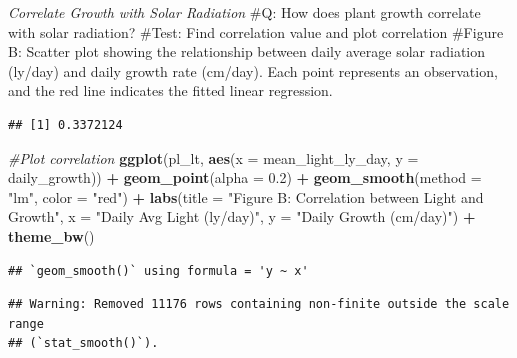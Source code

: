 \documentclass[
]{article}
\newenvironment{Shaded}{\begin{snugshade}}{\end{snugshade}}
\newcommand{\AttributeTok}[1]{\textcolor[rgb]{0.13,0.29,0.53}{#1}}
\newcommand{\CommentTok}[1]{\textcolor[rgb]{0.56,0.35,0.01}{\textit{#1}}}
\newcommand{\FloatTok}[1]{\textcolor[rgb]{0.00,0.00,0.81}{#1}}
\newcommand{\FunctionTok}[1]{\textcolor[rgb]{0.13,0.29,0.53}{\textbf{#1}}}
\newcommand{\NormalTok}[1]{#1}
\newcommand{\OtherTok}[1]{\textcolor[rgb]{0.56,0.35,0.01}{#1}}
\newcommand{\SpecialCharTok}[1]{\textcolor[rgb]{0.81,0.36,0.00}{\textbf{#1}}}
\newcommand{\StringTok}[1]{\textcolor[rgb]{0.31,0.60,0.02}{#1}}
\begin{document}
\emph{Correlate Growth with Solar Radiation} \#Q: How does plant growth
correlate with solar radiation? \#Test: Find correlation value and plot
correlation \#Figure B: Scatter plot showing the relationship between
daily average solar radiation (ly/day) and daily growth rate (cm/day).
Each point represents an observation, and the red line indicates the
fitted linear regression.

\begin{Shaded}
\end{Shaded}

\begin{verbatim}
## [1] 0.3372124
\end{verbatim}

\begin{Shaded}
\begin{Highlighting}[]
\CommentTok{\#Plot correlation}
\FunctionTok{ggplot}\NormalTok{(pl\_lt, }\FunctionTok{aes}\NormalTok{(}\AttributeTok{x =}\NormalTok{ mean\_light\_ly\_day, }\AttributeTok{y =}\NormalTok{ daily\_growth)) }\SpecialCharTok{+}
  \FunctionTok{geom\_point}\NormalTok{(}\AttributeTok{alpha =} \FloatTok{0.2}\NormalTok{) }\SpecialCharTok{+}
  \FunctionTok{geom\_smooth}\NormalTok{(}\AttributeTok{method =} \StringTok{"lm"}\NormalTok{, }\AttributeTok{color =} \StringTok{"red"}\NormalTok{) }\SpecialCharTok{+}
  \FunctionTok{labs}\NormalTok{(}\AttributeTok{title =} \StringTok{"Figure B: Correlation between Light and Growth"}\NormalTok{, }\AttributeTok{x =} \StringTok{"Daily Avg Light (ly/day)"}\NormalTok{, }\AttributeTok{y =} \StringTok{"Daily Growth (cm/day)"}\NormalTok{) }\SpecialCharTok{+}
  \FunctionTok{theme\_bw}\NormalTok{()}
\end{Highlighting}
\end{Shaded}

\begin{verbatim}
## `geom_smooth()` using formula = 'y ~ x'
\end{verbatim}

\begin{verbatim}
## Warning: Removed 11176 rows containing non-finite outside the scale range
## (`stat_smooth()`).
\end{verbatim}
\end{document}

